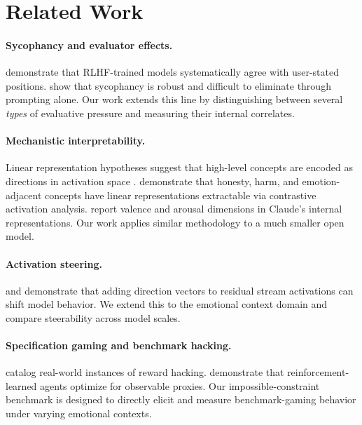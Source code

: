 \documentclass[11pt,a4paper]{article}
\begin{document}
\section{Related Work}
\label{sec:related}

\paragraph{Sycophancy and evaluator effects.}
\citet{perez2022sycophancy} demonstrate that RLHF-trained models systematically agree with user-stated positions. \citet{sharma2023towards} show that sycophancy is robust and difficult to eliminate through prompting alone. Our work extends this line by distinguishing between several \emph{types} of evaluative pressure and measuring their internal correlates.

\paragraph{Mechanistic interpretability.}
Linear representation hypotheses suggest that high-level concepts are encoded as directions in activation space \citep{elhage2022toy, park2023linear}. \citet{zou2023representation} demonstrate that honesty, harm, and emotion-adjacent concepts have linear representations extractable via contrastive activation analysis. \citet{anthropic2024emotions} report valence and arousal dimensions in Claude's internal representations. Our work applies similar methodology to a much smaller open model.

\paragraph{Activation steering.}
\citet{turner2023activation} and \citet{zou2023representation} demonstrate that adding direction vectors to residual stream activations can shift model behavior. We extend this to the emotional context domain and compare steerability across model scales.

\paragraph{Specification gaming and benchmark hacking.}
\citet{krakovna2020specification} catalog real-world instances of reward hacking. \citet{pan2022effects} demonstrate that reinforcement-learned agents optimize for observable proxies. Our impossible-constraint benchmark is designed to directly elicit and measure benchmark-gaming behavior under varying emotional contexts.
\end{document}
